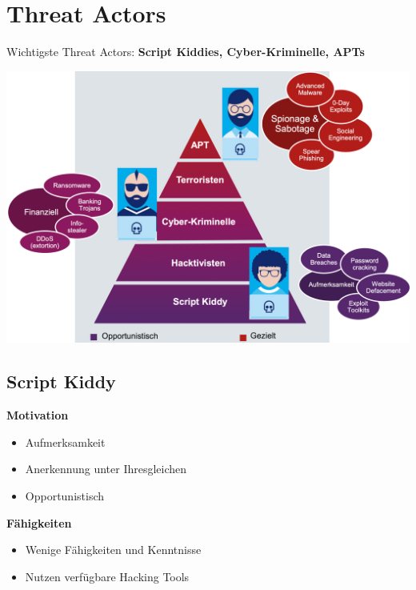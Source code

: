 \section{Threat Actors}
Wichtigste Threat Actors: \textbf{Script Kiddies, Cyber-Kriminelle, APTs}
\begin{center}
    \vspace{-8pt}
    \includegraphics[width=.8\linewidth]{./img/01-cyber_defense/threat_actors}
    \vspace{-8pt}
\end{center}


\subsection{Script Kiddy}
\vspace{-8pt}
\begin{multicols*}{2}
    \textbf{Motivation}
    \begin{itemize}
        \item Aufmerksamkeit
        \item Anerkennung unter Ihresgleichen
        \item Opportunistisch
    \end{itemize}
    \textbf{Fähigkeiten}
    \begin{itemize}
        \item Wenige Fähigkeiten und Kenntnisse
        \item Nutzen verfügbare Hacking Tools
    \end{itemize}
\end{multicols*}
\vspace{-8pt}


